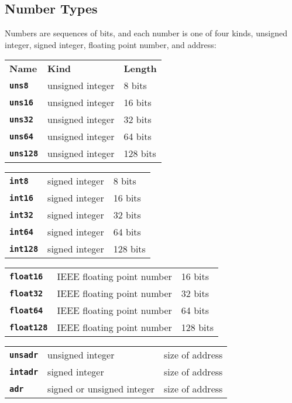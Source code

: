 \documentclass[12pt]{article}
\makeatletter
\newcommand{\TT}[1]{{\tt \bfseries #1}}
\newcommand{\ttkey}[1]{\TT{#1}\index{#1@{\tt #1}}}
\newenvironment{indpar}[1][0.3in]%
	{\begin{list}{}%
		     {\setlength{\itemsep}{0in}%
		      \setlength{\topsep}{0in}%
		      \setlength{\parsep}{1ex}%
		      \setlength{\labelwidth}{#1}%
		      \setlength{\leftmargin}{#1}%
		      \addtolength{\leftmargin}{\labelsep}}%
	 \item}%
	{\end{list}}
\makeatother
\begin{document}
\subsection{Number Types}
\label{NUMBER-TYPES}

Numbers are sequences of bits, and each number is one of
four kinds, unsigned integer, signed integer, floating point number,
and address:

\begin{indpar}
\begin{tabular}{p{1in}@{~~~~~~}p{2in}@{~~~~~~}l}
\bf Name & \bf Kind & \bf Length \\[2ex]
\ttkey{uns8}		& unsigned integer & 8 bits \\
\ttkey{uns16}		& unsigned integer & 16 bits \\
\ttkey{uns32}		& unsigned integer & 32 bits \\
\ttkey{uns64}		& unsigned integer & 64 bits \\
\ttkey{uns128}		& unsigned integer & 128 bits
\end{tabular}

\begin{tabular}{p{1in}@{~~~~~~}p{2in}@{~~~~~~}l}
\ttkey{int8}		& signed integer & 8 bits \\
\ttkey{int16}		& signed integer & 16 bits \\
\ttkey{int32}		& signed integer & 32 bits \\
\ttkey{int64}		& signed integer & 64 bits \\
\ttkey{int128}		& signed integer & 128 bits
\end{tabular}

\begin{tabular}{p{1in}@{~~~~~~}p{2in}@{~~~~~~}l}
\ttkey{float16}		& IEEE floating point number & 16 bits \\
\ttkey{float32}		& IEEE floating point number & 32 bits \\
\ttkey{float64}		& IEEE floating point number & 64 bits \\
\ttkey{float128}	& IEEE floating point number & 128 bits
\end{tabular}

\begin{tabular}{p{1in}@{~~~~~~}p{2in}@{~~~~~~}l}
\ttkey{unsadr}		& unsigned integer & size of address \\
\ttkey{intadr}		& signed integer & size of address \\
\ttkey{adr}		& signed or unsigned integer & size of address \\
\end{tabular}
\end{indpar}
\end{document}
